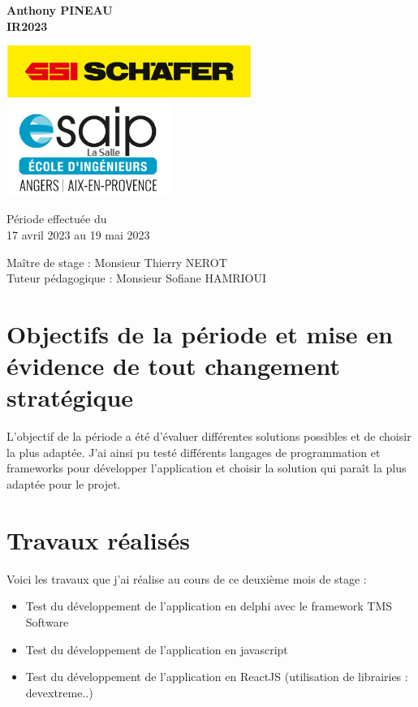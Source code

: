 \documentclass[a4paper, 12pt, french]{article}
\newcommand{\bdot}{\item[\color{ssiYellow}\ding{108}]}
\begin{document}
\begin{titlepage}
\begin{center}
			\textbf{Anthony PINEAU}\\
			\textbf{IR2023}

			\vfill

			\includegraphics[width=0.6\textwidth]{../images/schaefer.jpg}
			\vfill
			\includegraphics[width=0.4\textwidth]{../images/esaip.jpg}

			\vfill

			Période effectuée du\\
			17 avril 2023 au 19 mai 2023

			\vspace{0.8cm}
			
			\Large
			Maître de stage : Monsieur Thierry NEROT\\
			Tuteur pédagogique : Monsieur Sofiane HAMRIOUI\\
		\end{center}
	\end{titlepage}
		
	\newpage
	
	\doublespacing
	\tableofcontents
	
	\listoffigures
	
	\newpage
		
	
	\singlespacing

	\section{Objectifs de la période et mise en évidence de tout changement stratégique}
		L'objectif de la période a été d'évaluer différentes solutions possibles et de choisir la plus adaptée.
		J'ai ainsi pu testé différents langages de programmation et frameworks pour développer l'application et choisir la solution qui paraît la plus adaptée pour le projet.

	\section{Travaux réalisés}
		Voici les travaux que j'ai réalise au cours de ce deuxième mois de stage :
		\begin{itemize}
			\bdot{Test du développement de l'application en delphi avec le framework TMS Software}
			\bdot{Test du développement de l'application en javascript}
			\bdot{Test du développement de l'application en ReactJS (utilisation de librairies : devextreme..)}
		\end{itemize}
\end{document}
